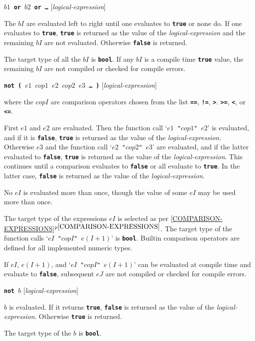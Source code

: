 \documentclass[12pt]{article}
\newcommand{\TT}[1]{{\tt \bfseries #1}}
\newcommand{\itemref}[1]{\ref{#1}$^{p\pageref{#1}}$}
\newenvironment{indpar}[1][0.3in]%
	{\begin{list}{}%
		     {\setlength{\itemsep}{0in}%
		      \setlength{\topsep}{0in}%
		      \setlength{\parsep}{1ex}%
		      \setlength{\labelwidth}{#1}%
		      \setlength{\leftmargin}{#1}%
		      \addtolength{\leftmargin}{\labelsep}}%
	 \item}%
	{\end{list}}
\begin{document}
\TT{$b1$ or $b2$ or \ldots{}}
\hfill [{\em logical-expression}]
\begin{indpar}
The $bI$ are evaluated left to right until one evaluates to
\TT{true} or none do.  If one evaluates to \TT{true},
\TT{true} is returned as the value of the {\em logical-expression}
and the remaining $bI$ are not evaluated.
Otherwise \TT{false} is returned.

The target type of all the $bI$ is \TT{bool}.  If any $bI$ is a
compile time \TT{true} value, the remaining $bI$ are not compiled
or checked for compile errors.
\end{indpar}

\TT{not ( $e1$ $cop1$ $e2$ $cop2$ $e3$ \ldots{} )}
\hfill [{\em logical-expression}]
\begin{indpar}
where the $copI$ are comparison operators chosen from the list
\TT{==}, \TT{!=}, \TT{>}. \TT{>=}, \TT{<}, or \TT{<=}.

First $e1$ and $e2$ are evaluated.  Then the function
call `{\tt $e1$ "$cop1$" $e2$}'
is evaluated, and if it is \TT{false},
\TT{true} is returned as the value of the {\em logical-expression}.
Otherwise $e3$ and the function call `{\tt $e2$ "$cop2$" $e3$}'
are evaluated, and if the latter
evaluated to \TT{false},
\TT{true} is returned as the value of the {\em logical-expression}.
This continues until a comparison evaluates to \TT{false} or all
evaluate to \TT{true}.  In the latter case, \TT{false} is returned as
the value of the {\em logical-expression}.

No $eI$ is evaluated more than once, though the value of some $eI$
may be used more than once.

The target type of the expressions $eI$ is selected as
per \itemref{COMPARISON-EXPRESSIONS}.  The target type of the
function calls `{\tt $eI$ "$copI$" $e(I+1)$}' is \TT{bool}.
Builtin comparison operators are defined for all implemented
numeric types.

If $eI$, $e(I+1)$, and `{\tt $eI$ "$copI$" $e(I+1)$}' can be evaluated
at compile time and evaluate to \TT{false}, subsequent
$eJ$ are not compiled or checked for compile errors.
\end{indpar}

\TT{not $b$}
\hfill [{\em logical-expression}]
\begin{indpar}
$b$ is evaluated.  If it returns \TT{true}, \TT{false} is
returned as the value of the {\em logical-expression}.
Otherwise \TT{true} is returned.

The target type of the $b$ is \TT{bool}.
\end{indpar}
\end{document}
